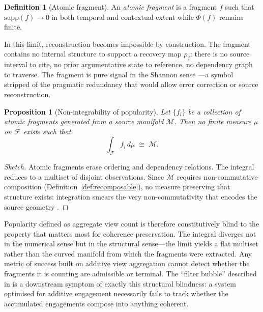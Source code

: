 \documentclass{amsart}
\theoremstyle{plain}
\newtheorem{proposition}[theorem]{Proposition}
\theoremstyle{definition}
\newtheorem{definition}[theorem]{Definition}
\theoremstyle{remark}
\newcommand{\scalar}{\Phi}
\newcommand{\Man}{\mathcal{M}}
\newcommand{\Frag}{\mathcal{F}}
\begin{document}
\begin{definition}[Atomic fragment]
  \label{def:atomic}
  An \emph{atomic fragment} is a fragment $f$ such that $\mathrm{supp}(f) \to 0$
  in both temporal and contextual extent while $\scalar(f)$ remains finite.
\end{definition}

In this limit, reconstruction becomes impossible by construction.  The fragment
contains no internal structure to support a recovery map $\rho_f$: there is no
source interval to cite, no prior argumentative state to reference, no dependency
graph to traverse.  The fragment is pure signal in the Shannon sense
\cite{shannon1948}---a symbol stripped of the pragmatic redundancy that would
allow error correction or source reconstruction.

\begin{proposition}[Non-integrability of popularity]
  \label{prop:nonintegrable}
  Let $\{f_i\}$ be a collection of atomic fragments generated from a source
  manifold $\Man$.  Then no finite measure $\mu$ on $\Frag$ exists such that
  \[
    \int_{\Frag} f_i \, d\mu \;\cong\; \Man.
  \]
\end{proposition}

\begin{proof}[Sketch]
  Atomic fragments erase ordering and dependency relations.  The integral reduces
  to a multiset of disjoint observations.  Since $\Man$ requires non-commutative
  composition (Definition~\ref{def:recomposable}), no measure preserving that
  structure exists: integration smears the very non-commutativity that encodes the
  source geometry \cite{lurie2009,maclane1998}.
\end{proof}

Popularity defined as aggregate view count is therefore constitutively blind to the
property that matters most for coherence preservation.  The integral diverges not
in the numerical sense but in the structural sense---the limit yields a flat
multiset rather than the curved manifold from which the fragments were extracted.
Any metric of success built on additive view aggregation cannot detect whether the
fragments it is counting are admissible or terminal.  The ``filter bubble''
described in \cite{pariser2011} is a downstream symptom of exactly this structural
blindness: a system optimised for additive engagement necessarily fails to track
whether the accumulated engagements compose into anything coherent.

\end{document}
